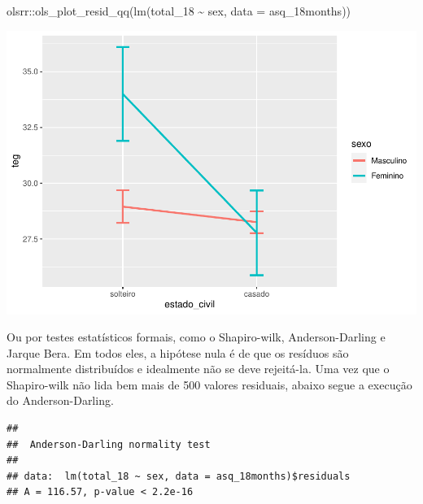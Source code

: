 \documentclass[
]{book}
\newenvironment{Shaded}{\begin{snugshade}}{\end{snugshade}}
\newcommand{\AttributeTok}[1]{\textcolor[rgb]{0.77,0.63,0.00}{#1}}
\newcommand{\FunctionTok}[1]{\textcolor[rgb]{0.00,0.00,0.00}{#1}}
\newcommand{\NormalTok}[1]{#1}
\newcommand{\SpecialCharTok}[1]{\textcolor[rgb]{0.00,0.00,0.00}{#1}}
\begin{document}
\begin{Shaded}
\begin{Highlighting}[]
\NormalTok{olsrr}\SpecialCharTok{::}\FunctionTok{ols\_plot\_resid\_qq}\NormalTok{(}\FunctionTok{lm}\NormalTok{(total\_18 }\SpecialCharTok{\textasciitilde{}}\NormalTok{ sex, }\AttributeTok{data =}\NormalTok{ asq\_18months))}
\end{Highlighting}
\end{Shaded}

\begin{center}\includegraphics{gitbook-demo_files/figure-latex/unnamed-chunk-71-1} \end{center}

Ou por testes estatísticos formais, como o Shapiro-wilk, Anderson-Darling e Jarque Bera. Em todos eles, a hipótese nula é de que os resíduos são normalmente distribuídos e idealmente não se deve rejeitá-la. Uma vez que o Shapiro-wilk não lida bem mais de 500 valores residuais, abaixo segue a execução do Anderson-Darling.

\begin{Shaded}
\end{Shaded}

\begin{verbatim}
## 
##  Anderson-Darling normality test
## 
## data:  lm(total_18 ~ sex, data = asq_18months)$residuals
## A = 116.57, p-value < 2.2e-16
\end{verbatim}
\end{document}
